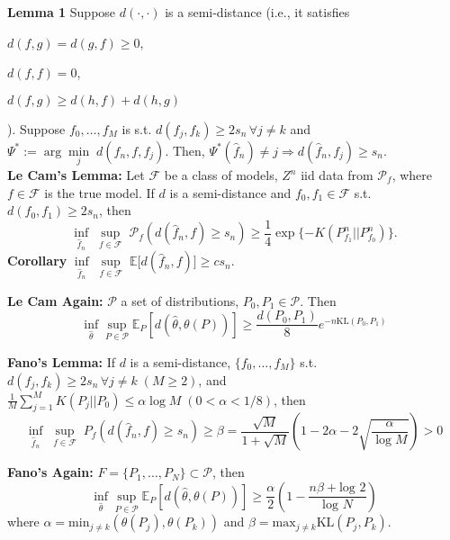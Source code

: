 \documentclass[10pt,twocolumn]{article}
\begin{document}
    \textbf{Lemma 1} Suppose $d(\cdot,\cdot)$ is a semi-distance (i.e., it satisfies 
    \begin{inparaenum}
    \item $d(f,g) = d(g,f) \geq 0$,
    \item $d(f,f) = 0$,
    \item $d(f,g) \geq d(h,f) + d(h,g)$
    \end{inparaenum}
    ). Suppose $f_0,\ldots,f_M$ is s.t. $d(f_j,f_k) \geq 2s_n \, \forall j \neq k$ and $\Psi^* := \arg \underset{j}{\min} \; d(\hat{f}_n,f,f_j)$. Then, $\Psi^*(\hat{f}_n) \neq j \Rightarrow d(\hat{f}_n,f_j) \geq s_n$.\\
    \textbf{Le Cam's Lemma:} Let $\mathcal{F}$ be a class of models, $Z^n$ iid data from $\mathcal{P}_f$, where $f\in\mathcal{F}$ is the true model. If $d$ is a semi-distance and $f_0,f_1 \in \mathcal{F}$ s.t. $d(f_0,f_1) \geq 2s_n$, then 
    \begin{equation}
        \underset{\hat{f}_n}{\inf} \; \underset{f\in\mathcal{F}} {\sup} \; \mathcal{P}_f(d(\hat{f}_n,f) \geq s_n) \geq \frac{1}{4} \exp\lbrace-K(P^n_{f_1} || P^n_{f_0})\rbrace.
    \end{equation}
    \textbf{Corollary} $\underset{\hat{f}_n}{\inf} \; \underset {f\in\mathcal{F}}{\sup} \; \mathbb{E} \lbrack d(\hat{f}_n,f)\rbrack \geq cs_n$.
    
    \textbf{Le Cam Again:} $\mathcal{P}$ a set of distributions, $P_0, P_1 \in \mathcal{P}$. Then 
    \begin{equation}
        \inf_{\hat{\theta}} \sup_{P \in \mathcal{P}} \mathbb{E}_P[d(\hat{\theta}, \theta(P))] \geq \frac{d(P_0,P_1)}{8} e^{-n \text{KL}(P_0,P_1)}
    \end{equation}

    \textbf{Fano's Lemma:} If $d$ is a semi-distance, $\lbrace f_0,\ldots,f_M \rbrace$ s.t. $d(f_j,f_k) \geq 2s_n \, \forall j \neq k \; (M \geq 2)$, and $\frac{1}{M}\sum_{j=1}^{M} K(P_j||P_0) \leq \alpha \log M \; (0 < \alpha < 1/8)$, then
    \begin{equation}
        \underset{\hat{f}_n}{\inf} \; \underset{f\in\mathcal{F}}{\sup} \; P_f(d(\hat{f}_n,f) \geq s_n) \geq \beta = \frac{\sqrt{M}}{1+\sqrt{M}}\left(1 - 2\alpha - 2\sqrt{\frac{\alpha}{\log M}}\right) > 0
    \end{equation}

    \textbf{Fano's Again:} $F = \{P_1,\ldots,P_N\} \subset \mathcal{P}$, then
    \begin{equation}
        \inf_{\hat{\theta}} \sup_{P \in \mathcal{P}} \mathbb{E}_P[d(\hat{\theta}, \theta(P))] 
        \geq \frac{\alpha}{2}\left( 1 - \frac{n\beta + \text{log }2}{\text{log }N}  \right)
    \end{equation}
    where $\alpha = \text{min}_{j \neq k}(\theta(P_j), \theta(P_k))$ and $\beta = \text{max}_{j \neq k} \text{KL}(P_j,P_k)$.
\end{document}
